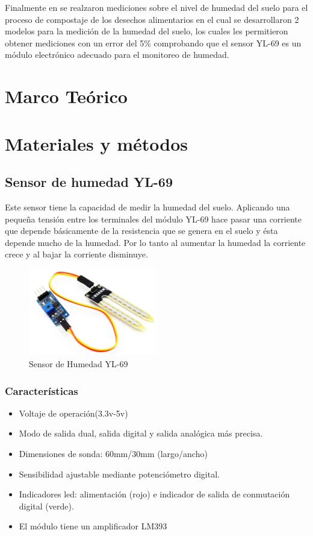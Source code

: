 \documentclass[conference]{IEEEtran}
\begin{document}
	Finalmente en \cite{lowcosthumidity} se realzaron mediciones sobre el nivel de humedad del suelo para el proceso de compostaje de los desechos alimentarios en el cual se desarrollaron 2 modelos para la medición de la humedad del suelo, los cuales les permitieron obtener mediciones con un error del 5\% comprobando que el sensor YL-69 es un módulo electrónico adecuado para el monitoreo de humedad.
	
	\section{Marco Teórico} 
	
	
	\section{Materiales y métodos}
	\subsection{Sensor de humedad YL-69}
	Este sensor tiene la capacidad de medir la humedad del suelo. Aplicando una pequeña tensión entre los terminales del módulo YL-69 hace pasar una corriente que depende básicamente de la resistencia que se genera en el suelo y ésta depende mucho de la humedad. Por lo tanto al aumentar la humedad la corriente crece y al bajar la corriente disminuye.
	\begin{figure}
		\centering
		\includegraphics[width=0.5\textwidth]{media/[YL-69] YL-69 Soil Moisture Hygrometer Detection Humidity Sensor Module For arduino Development Board DIY .jpg}
		\caption{Sensor de Humedad YL-69}
		\label{fig:enter-label}
	\end{figure}
	\subsubsection{Características}
	\begin{itemize}
		\item Voltaje de operación(3.3v-5v)
		\item Modo de salida dual, salida digital y salida analógica más precisa.
		\item Dimensiones de sonda: 60mm/30mm (largo/ancho)
		\item Sensibilidad ajustable mediante potenciómetro digital.
		\item Indicadores led: alimentación (rojo) e indicador de salida de conmutación digital (verde).
		\item El módulo tiene un amplificador LM393
	\end{itemize}
\end{document}
